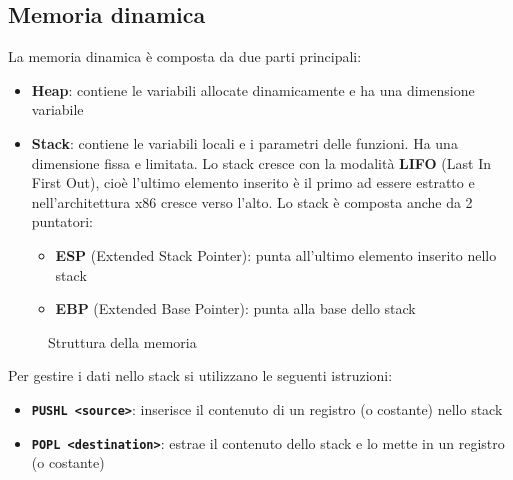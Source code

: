 \documentclass[a4paper]{article}
\theoremstyle{break}
\theoremstyle{break}
\theoremstyle{break}
\theoremstyle{break}
\begin{document}
\subsection{Memoria dinamica}
La memoria dinamica è composta da due parti principali:
\begin{itemize}
	\item \textbf{Heap}: contiene le variabili allocate dinamicamente e ha una dimensione variabile
	\item \textbf{Stack}: contiene le variabili locali e i parametri delle funzioni. Ha una dimensione fissa
	      e limitata. Lo stack cresce con la modalità \textbf{LIFO} (Last In First Out), cioè l'ultimo
	      elemento inserito è il primo ad essere estratto e nell'architettura x86 cresce verso l'alto.
	      Lo stack è composta anche da 2 puntatori:
	      \begin{itemize}
		      \item \textbf{ESP} (Extended Stack Pointer): punta all'ultimo elemento inserito nello stack
		      \item \textbf{EBP} (Extended Base Pointer): punta alla base dello stack
	      \end{itemize}
\end{itemize}

\begin{figure}[H]
	\centering
	\caption{Struttura della memoria}
\end{figure}

\noindent Per gestire i dati nello stack si utilizzano le seguenti istruzioni:
\begin{itemize}
	\item \textbf{\texttt{PUSHL <source>}}: inserisce il contenuto di un registro (o costante) nello stack
	\item \textbf{\texttt{POPL <destination>}}: estrae il contenuto dello stack e lo mette in un registro (o costante)
\end{itemize}
\end{document}
